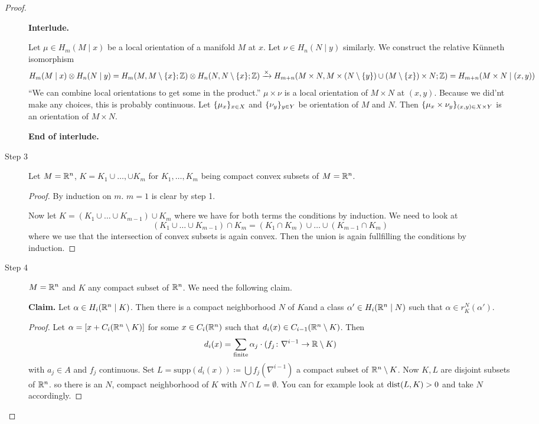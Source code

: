\documentclass[language=english]{TemplateLecture}
\begin{document}
\begin{proof}
\begin{description}

\textbf{Interlude.}

\begin{construction}
    Let \(\mu \in H_m(M \mid x)\) be a local orientation of a manifold \(M\) at \(x\). Let \(\nu \in H_n(N\mid y)\) similarly. We construct the relative Künneth isomorphism 
    \[H_m(M \mid x) \otimes H_n(N \mid y) = H_m(M, M \setminus \{x\}; \mathbb{Z}) \otimes H_n(N, N \setminus \{x\}; \mathbb{Z}) \xrightarrow{\times} H_{m+n}(M\times N, M \times (N\setminus \{y\}) \cup (M\setminus \{x\})\times N; \mathbb{Z}) = H_{m+n}(M \times N \mid (x,y))\]
    \enquote{We can combine local orientations to get some in the product.}
    \(\mu \times \nu\) is a local orientation of \(M \times N\) at \((x,y)\). Because we did'nt make any choices, this is probably continuous. Let \(\{\mu_x\}_{x \in X}\) and \(\{\nu_y\}_{y \in Y}\) be orientation of \(M\) and \(N\). Then \(\{\mu_x \times \nu_y\}_{(x,y) \in X \times Y}\) is an orientation of \(M \times N\).
\end{construction}

\textbf{End of interlude.}

    \item[Step 3] Let \(M = \mathbb{R}^n\), \(K = K_1 \cup \dots, \cup K_m\) for \(K_1, \dots, K_m\) being compact convex subsets of \(M = \mathbb{R}^n\).
    
    \begin{proof}
        By induction on \(m\). \(m = 1\) is clear by step 1.

        Now let \(K = (K_1 \cup \dots \cup K_{m-1}) \cup K_m\) where we have for both terms the conditions by induction. We need to look at
        \[(K_1 \cup \dots \cup K_{m-1}) \cap K_m = (K_1 \cap K_m) \cup \dots \cup (K_{m-1} \cap K_m)\]
        where we use that the intersection of convex subsets is again convex. Then the union is again fullfilling the conditions by induction.
    \end{proof}

    \item[Step 4] \(M = \mathbb{R}^n\) and \(K\) any compact subset of \(\mathbb{R}^n\). We need the following claim.
    
    \textbf{Claim.} Let \(\alpha\in H_i(\mathbb{R}^n \mid K)\). Then there is a compact neighborhood \(N\) of \(K\)and a class \(\alpha'\in H_i(\mathbb{R}^n \mid N)\) such that \(\alpha \in r_K^N(\alpha')\).

    \begin{proof}
        Let \(\alpha = [x + C_i(\mathbb{R}^n \setminus K)]\) for some \(x \in C_i(\mathbb{R}^n)\) such that \(d_i(x) \in C_{i-1}(\mathbb{R}^n\setminus K)\). Then
        \[d_i(x) = \sum_{\text{finite}} \alpha_j \cdot (f_j\colon \nabla^{i-1} \to \mathbb{R}\setminus K)\]
        with \(a_j \in A\) and \(f_j\) continuous. Set \(L = \mathrm{supp}(d_i(x)) \coloneq \bigcup f_j(\nabla^{i-1})\) a compact subset of \(\mathbb{R}^n\setminus K\). Now \(K,L\) are disjoint subsets of \(\mathbb{R}^n\). so there is an \(N\), compact neighborhood of \(K\) with \(N \cap L = \emptyset\). You can for example look at \(\operatorname{dist}(L,K) > 0\) and take \(N\) accordingly.


\end{proof}
\end{description}
\end{proof}
\end{document}
